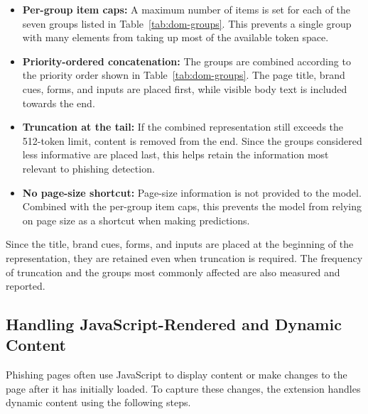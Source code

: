 \documentclass{FastFyp}
\begin{document}
\begin{itemize}
    \item \textbf{Per-group item caps:} A maximum number of items is set for each of the seven groups listed in Table~\ref{tab:dom-groups}. This prevents a single group with many elements from taking up most of the available token space.

    \item \textbf{Priority-ordered concatenation:} The groups are combined according to the priority order shown in Table~\ref{tab:dom-groups}. The page title, brand cues, forms, and inputs are placed first, while visible body text is included towards the end.

    \item \textbf{Truncation at the tail:} If the combined representation still exceeds the 512-token limit, content is removed from the end. Since the groups considered less informative are placed last, this helps retain the information most relevant to phishing detection.

    \item \textbf{No page-size shortcut:} Page-size information is not provided to the model. Combined with the per-group item caps, this prevents the model from relying on page size as a shortcut when making predictions.
\end{itemize}

Since the title, brand cues, forms, and inputs are placed at the beginning of the representation, they are retained even when truncation is required. The frequency of truncation and the groups most commonly affected are also measured and reported.

\subsection{Handling JavaScript-Rendered and Dynamic Content}
\label{sec:js-dynamic}

Phishing pages often use JavaScript to display content or make changes to the page after it has initially loaded. To capture these changes, the extension handles dynamic content using the following steps.
\end{document}
